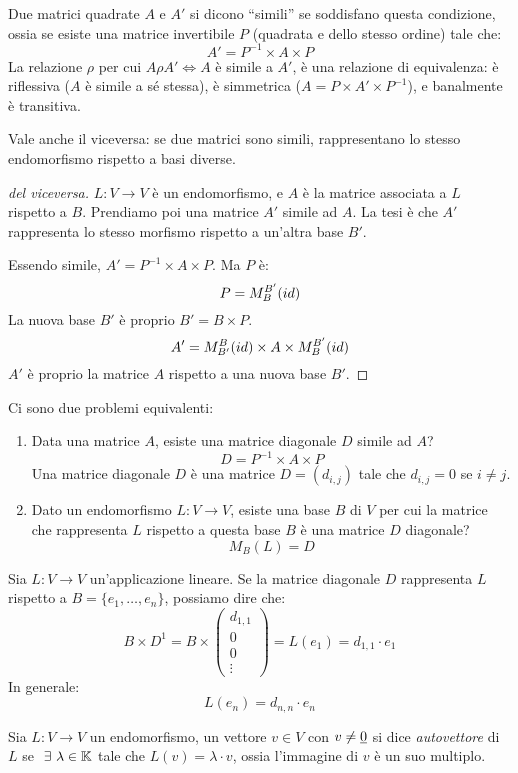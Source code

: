\begin{defn}
Due matrici quadrate $A$ e $A'$ si dicono ``simili'' se soddisfano questa condizione, ossia se esiste una matrice invertibile $P$ (quadrata e dello stesso ordine) tale che:
\[
A' = P^{-1} \times A \times P
\]
La relazione $\rho$ per cui $A \rho A' \iff A$ \`e simile a $A'$, \`e una relazione di equivalenza: \`e riflessiva ($A$ \`e simile a s\'e stessa), \`e simmetrica ($A = P \times A' \times P^{-1}$), e banalmente \`e transitiva.

Vale anche il viceversa: se due matrici sono simili, rappresentano lo stesso endomorfismo rispetto a basi diverse.
\end{defn}
\begin{proof}[del viceversa]
$L : V \to V$ \`e un endomorfismo, e $A$ \`e la matrice associata a $L$ rispetto a $B$. Prendiamo poi una matrice $A'$ simile ad $A$. La tesi \`e che $A'$ rappresenta lo stesso morfismo rispetto a un'altra base $B'$.

Essendo simile, $A' = P^{-1} \times A \times P$. Ma $P$ \`e:
\[
P = M_{B}^{B'} (id)
\]
La nuova base $B'$ \`e proprio $B' = B \times P$.
\[
A' = M_{B'}^{B} (id) \times A \times M_{B}^{B'} (id)
\]
$A'$ \`e proprio la matrice $A$ rispetto a una nuova base $B'$.
\end{proof}


Ci sono due problemi equivalenti:
\begin{enumerate}
    \item Data una matrice $A$, esiste una matrice diagonale $D$ simile ad $A$?
    \[
    D = P^{-1} \times A \times P
    \]
    Una matrice diagonale $D$ \`e una matrice $D = (d_{i,j}) $ tale che $ d_{i,j} = 0 $ se $ i \neq j$.
    \item Dato un endomorfismo $L : V \to V$, esiste una base $B$ di $V$ per cui la matrice che rappresenta $L$ rispetto a questa base $B$ \`e una matrice $D$ diagonale?
    \[
    M_{B} (L) = D
    \]
\end{enumerate}

Sia $L : V \to V$ un'applicazione lineare. Se la matrice diagonale $D$ rappresenta $L$ rispetto a $B = \{ e_1, \ldots, e_n \}$, possiamo dire che:
\[
B \times D^{1} = B \times 
\begin{pmatrix}
d_{1,1} \\ 0 \\ 0 \\ \vdots
\end{pmatrix} = L(e_1) = d_{1,1} \cdot e_1
\]
In generale:
\[
L(e_n) = d_{n,n} \cdot e_n
\]
\begin{defn}
Sia $L : V \to V$ un endomorfismo, un vettore $v \in V$ con $v \neq \underline{0}$ si dice \emph{autovettore} di $L$ se $\exists \lambda \in \field$ tale che $L(v) = \lambda \cdot v$, ossia l'immagine di $v$ \`e un suo multiplo.
\end{defn}

